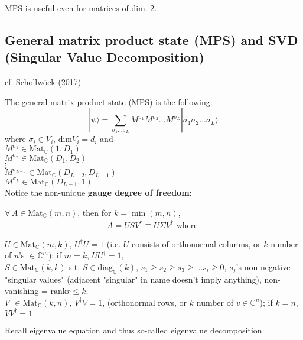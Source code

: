 \documentclass[10pt]{amsart}
\begin{document}
\begin{multicols*}{2}
MPS is useful even for matrices of dim. 2.


\subsection{General matrix product state (MPS) and SVD (Singular Value Decomposition)}

cf. Schollw\"{o}ck (2017) \cite{ArSo2017}

The general matrix product state (MPS) is the following:
\begin{equation}
|\psi \rangle = \sum_{ \sigma_1 \dots \sigma_L } M^{\sigma_1} M^{\sigma_2} \dots M^{\sigma_L} | \sigma_1 \sigma_2 \dots \sigma_L \rangle
\end{equation}
where $\sigma_i \in V_i$, $\text{dim}V_i = d_i$ and \\
$M^{\sigma_1} \in \text{Mat}_{\mathbb{C}}(1, D_1)$ \\ 
$M^{\sigma_2} \in \text{Mat}_{\mathbb{C}}(D_1, D_2)$ \\ 
$\vdots$ \\ 
$M^{\sigma_{L-1}} \in \text{Mat}_{\mathbb{C}}(D_{L-2}, D_{L-1})$ \\ 
$M^{\sigma_L} \in \text{Mat}_{\mathbb{C}}(D_{L-1}, 1)$ \\ 

Notice the non-unique \textbf{gauge degree of freedom}:

$\forall \, A \in \text{Mat}_{\mathbb{C}}(m,n)$, then for $k = \min{(m,n)}$, 
\begin{equation}
\begin{gathered}
A = U SV^{\dagger} \equiv U \Sigma V^{\dagger} \text{ where }
\end{gathered}
\end{equation}

$U \in \text{Mat}_{\mathbb{C}}(m,k)$, $U^{\dagger} U =1$ (i.e. $U$ consists of orthonormal columns, or $k$ number of $u$'s $\in \mathbb{C}^m$); if $m=k$, $UU^{\dagger} = 1$, \\
$S \in \text{Mat}_{\mathbb{C}}(k,k)$ s.t. $S \in \text{diag}_{\mathbb{C}}(k)$, $s_1 \geq s_2 \geq s_3 \geq \dots s_i \geq 0$, $s_j$'s non-negative "singular values" (adjacent "singular" in name doesn't imply anything), non-vanishing = $\text{rank} r \leq k$. \\
$V^{\dagger} \in \text{Mat}_{\mathbb{C}}(k,n)$, $V^{\dagger} V = 1$, (orthonormal rows, or $k$ number of $v\in \mathbb{C}^n$); if $k=n $, $VV^{\dagger} = 1$

Recall eigenvalue equation and thus so-called eigenvalue decomposition.


\end{multicols*}
\end{document}
